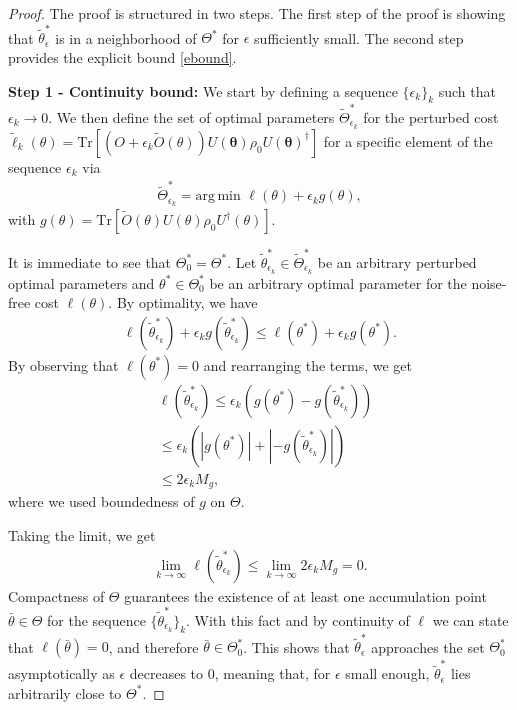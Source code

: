 \documentclass[letterpaper, 10 pt]{IEEEtran}  %
\newcommand{\Tr}{\mathrm{Tr}}
\newcommand{\argmin}{\mathrm{arg\,min\,\,}}
\begin{document}
\begin{proof}
The proof is structured in two steps.   
The first step of the proof is showing that $\tilde\theta^*_\epsilon$ is in a neighborhood of $\Theta^*$ for $\epsilon$ sufficiently small. 
The second step provides the explicit bound \eqref{ebound}. 

\textbf{Step 1 - Continuity bound:}
We start by defining a sequence $\{\epsilon_k \}_k$ such that $\epsilon_k \rightarrow 0$. 
We then define the set of optimal parameters $\tilde{\Theta}_{\epsilon_k}^*$ for the perturbed cost $\tilde{\ell}_k(\theta)=\Tr[(O+\epsilon_k \tilde{O}(\theta)) U(\mathbf{\theta}) \rho_0 U(\mathbf{\theta})^\dagger] $ 
for a specific element of the sequence $\epsilon_k$ via
\begin{align}
   \tilde{\Theta}_{\epsilon_k}^* = \argmin \ell(\theta) + \epsilon_k g(\theta),
\end{align}
with $g(\theta) = \Tr[\tilde{O}(\theta) U(\theta) \rho_0 U^\dagger(\theta)]$. 

It is immediate to see that $\Theta^*_0=\Theta^*$. Let $\tilde{\theta}_{\epsilon_k}^* \in \tilde{\Theta}_{\epsilon_k}^*$ be an arbitrary perturbed optimal parameters and $\theta^* \in \Theta^*_0$  be an arbitrary optimal parameter for the noise-free cost $\ell(\theta)$.
By optimality, we have 
\begin{align}
   \ell(\tilde{\theta}_{\epsilon_k}^*) + \epsilon_k g(\tilde{\theta}_{\epsilon_k}^*) \le \ell(\theta^*) + \epsilon_k g(\theta^*).
\end{align}
By observing that $\ell(\theta^*)=0$ and rearranging the terms, we get
\begin{align}
   & \ell(\tilde{\theta}_{\epsilon_k}^*) \le \epsilon_k(g(\theta^*) - g(\tilde{\theta}_{\epsilon_k}^*)) \nonumber \\
   &\le \epsilon_k (|g(\theta^*)| + |- g(\tilde{\theta}_{\epsilon_k}^*)|) \nonumber \\
   &\le 2 \epsilon_k M_g,
\end{align}
where we used boundedness of $g$ on $\Theta$.


Taking the limit, we get 
\begin{align}
   \lim_{k \rightarrow \infty} \ell(\tilde{\theta}_{\epsilon_k}^*) \le \lim_{k \rightarrow \infty} 2 \epsilon_k M_g = 0. 
\end{align}
Compactness of $\Theta$ guarantees the existence of at least one accumulation point $\bar\theta \in \Theta$ for the sequence $\{\tilde{\theta}^*_{\epsilon_k}\}_k$. 
With this fact and by continuity of $\ell$ we can state that $\ell(\bar\theta) = 0$, and therefore $\bar\theta \in \Theta^*_0$. 
This shows that $\tilde{\theta}^*_\epsilon$ approaches the set $\Theta^*_0$ asymptotically as $\epsilon$ decreases to $0$, meaning that, for $\epsilon$ small enough, $\tilde{\theta}_{\epsilon}^*$ lies arbitrarily close to $\Theta^*$.


\end{proof}
\end{document}
